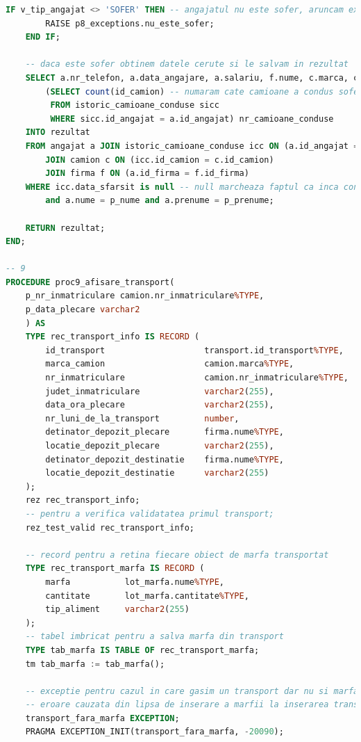 \documentclass[12pt, a4paper]{article}
\begin{document}
\begin{lstlisting}[language=SQL]
    IF v_tip_angajat <> 'SOFER' THEN -- angajatul nu este sofer, aruncam exceptie
        RAISE p8_exceptions.nu_este_sofer;
    END IF;
    
    -- daca este sofer obtinem datele cerute si le salvam in rezultat
    SELECT a.nr_telefon, a.data_angajare, a.salariu, f.nume, c.marca, c.nr_inmatriculare,
        (SELECT count(id_camion) -- numaram cate camioane a condus soferul folosind o subcerere
         FROM istoric_camioane_conduse sicc
         WHERE sicc.id_angajat = a.id_angajat) nr_camioane_conduse
    INTO rezultat
    FROM angajat a JOIN istoric_camioane_conduse icc ON (a.id_angajat = icc.id_angajat)
        JOIN camion c ON (icc.id_camion = c.id_camion)
        JOIN firma f ON (a.id_firma = f.id_firma)
    WHERE icc.data_sfarsit is null -- null marcheaza faptul ca inca conduce camionul
        and a.nume = p_nume and a.prenume = p_prenume;

    RETURN rezultat;
END;

-- 9 
PROCEDURE proc9_afisare_transport(
    p_nr_inmatriculare camion.nr_inmatriculare%TYPE,
    p_data_plecare varchar2
    ) AS
    TYPE rec_transport_info IS RECORD (
        id_transport                    transport.id_transport%TYPE,
        marca_camion                    camion.marca%TYPE,
        nr_inmatriculare                camion.nr_inmatriculare%TYPE,
        judet_inmatriculare             varchar2(255),
        data_ora_plecare                varchar2(255),
        nr_luni_de_la_transport         number,
        detinator_depozit_plecare       firma.nume%TYPE,
        locatie_depozit_plecare         varchar2(255),
        detinator_depozit_destinatie    firma.nume%TYPE,
        locatie_depozit_destinatie      varchar2(255)
    );
    rez rec_transport_info;
    -- pentru a verifica validatatea primul transport;
    rez_test_valid rec_transport_info;

    -- record pentru a retina fiecare obiect de marfa transportat
    TYPE rec_transport_marfa IS RECORD (
        marfa           lot_marfa.nume%TYPE,
        cantitate       lot_marfa.cantitate%TYPE,
        tip_aliment     varchar2(255)
    );
    -- tabel imbricat pentru a salva marfa din transport
    TYPE tab_marfa IS TABLE OF rec_transport_marfa;
    tm tab_marfa := tab_marfa();
    
    -- exceptie pentru cazul in care gasim un transport dar nu si marfa acestuia
    -- eroare cauzata din lipsa de inserare a marfii la inserarea transportului
    transport_fara_marfa EXCEPTION;
    PRAGMA EXCEPTION_INIT(transport_fara_marfa, -20090);
    

\end{lstlisting}
\end{document}
